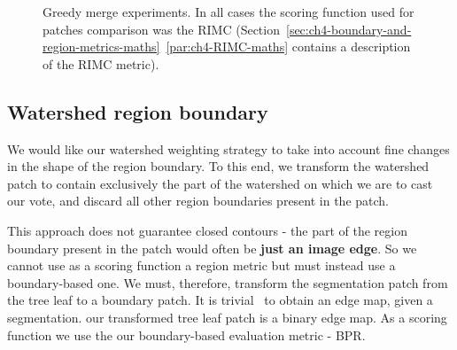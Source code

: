 \begin{figure}[ht!]
\centering
\caption[Greedy merge experiments]{Greedy merge experiments. In all cases the scoring function used for patches comparison was the RIMC (Section~\ref*{sec:ch4-boundary-and-region-metrics-maths}~\ref{par:ch4-RIMC-maths} contains a description of the RIMC metric).} %
\label{fig:segs-to-greedy-merge-RIMC}
\end{figure}

\subsection{Watershed region boundary}
We would like our watershed weighting strategy to take into account fine changes in the shape of the region boundary. To this end, we transform the watershed patch to contain exclusively the part of the watershed on which we are to cast our vote, and discard all other region boundaries present in the patch.

This approach does not guarantee closed contours - the part of the region boundary present in the patch would often be \textbf{just an image edge}. So we cannot use as a scoring function a region metric but must instead use a boundary-based one. We must, therefore, transform the segmentation patch from the tree leaf to a boundary patch. It is trivial~\cite{Arbelaez11} to obtain an edge map, given a segmentation. our transformed tree leaf patch is a binary edge map. As a scoring function we use the our boundary-based evaluation metric - BPR.

